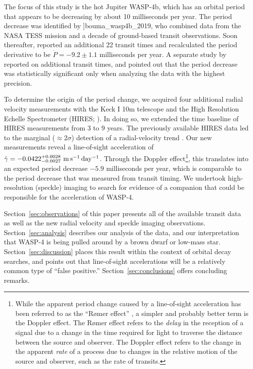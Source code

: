 \documentclass[12pt,twocolumn,tighten]{aastex62}
\begin{document}
The focus of this study is the hot Jupiter WASP-4b, which has an
orbital period that appears to be decreasing by about 10 milliseconds
per year.  The period decrease was identified by \citet{bouma_wasp4b_2019}]{bouma_wasp4b_2019},
who combined data from
the NASA TESS mission \citep{ricker_transiting_2015} and a decade of ground-based
transit observations. Soon thereafter, \citet{southworth_transit_2019} reported an additional
22 transit times and recalculated the period derivative to be $\dot{P} = -9.2 \pm 1.1$
milliseconds per year.  A separate study by \citet{baluev_2019}
reported on additional transit times, and pointed out
that the period decrease was statistically significant only when
analyzing the data with the highest precision.

To determine the origin of the period change, we acquired four
additional radial velocity measurements with the Keck I 10m telescope
and the High Resolution Echelle
Spectrometer (HIRES; \citealt{vogt_hires_1994}).
In doing so, we extended
the time baseline of HIRES measurements from 3 to 9 years.
The previously available HIRES data led to the marginal ($\approx$$2\sigma$)
detection of a radial-velocity trend \citep{knutson_friends_2014}.
Our new measurements reveal a
line-of-sight acceleration of $\dot{\gamma} =
-0.0422^{+0.0028}_{-0.0027}\ {\rm m\,s^{-1}\,day^{-1}}$.
Through the Doppler effect\footnote{While the apparent period change caused by a
line-of-sight acceleration has been referred to as the ``R{\o}mer
effect'' \citep{yee_orbit_2020}, a simpler and probably better term is
the Doppler effect. The R{\o}mer effect refers to the {\it delay} in
the reception of a signal due to a change in the time required for
light to traverse the distance between the source and observer. The Doppler
effect refers to the change in the apparent {\it rate} of a process due
to changes in the relative motion of the source and observer, such
as the rate of transits.}, this translates into an expected period decrease
$-5.9$ milliseconds per year, which is comparable to the period decrease
that was measured from transit timing.  We undertook high-resolution
(speckle) imaging to search for evidence of a companion that could
be responsible for the acceleration of WASP-4.

Section~\ref{sec:observations} of this paper presents all of the
available transit data as well as the new radial velocity and
speckle imaging observations.  Section~\ref{sec:analysis} describes
our analysis of the data, and our interpretation
that WASP-4 is being pulled around by a brown dwarf or low-mass star.
Section~\ref{sec:discussion} places this
result within the context of orbital decay searches, and points
out that line-of-sight accelerations will be a relatively
common type of ``false positive.''
Section~\ref{sec:conclusions} offers concluding remarks.
\end{document}
